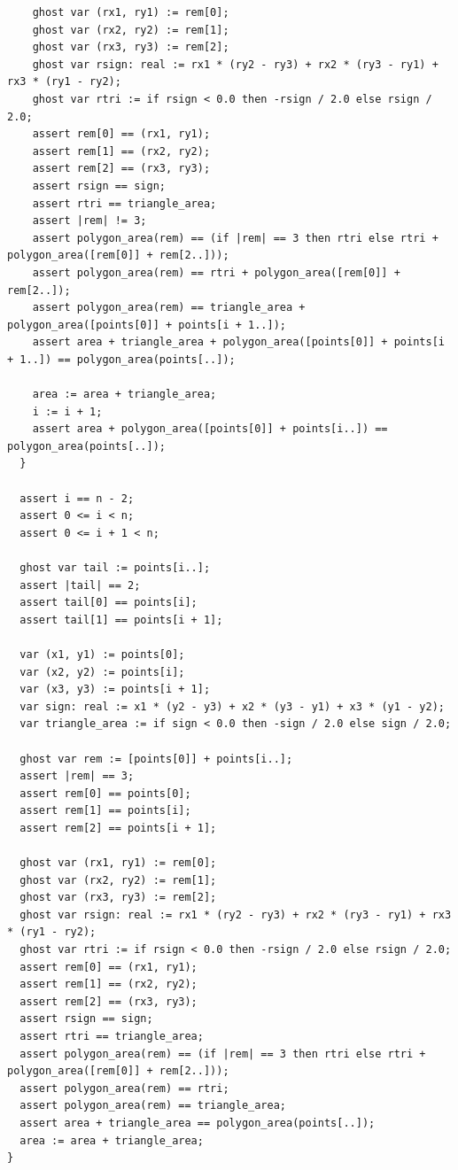 \documentclass{article}
\begin{document}
\begin{lstlisting}
    ghost var (rx1, ry1) := rem[0];
    ghost var (rx2, ry2) := rem[1];
    ghost var (rx3, ry3) := rem[2];
    ghost var rsign: real := rx1 * (ry2 - ry3) + rx2 * (ry3 - ry1) + rx3 * (ry1 - ry2);
    ghost var rtri := if rsign < 0.0 then -rsign / 2.0 else rsign / 2.0;
    assert rem[0] == (rx1, ry1);
    assert rem[1] == (rx2, ry2);
    assert rem[2] == (rx3, ry3);
    assert rsign == sign;
    assert rtri == triangle_area;
    assert |rem| != 3;
    assert polygon_area(rem) == (if |rem| == 3 then rtri else rtri + polygon_area([rem[0]] + rem[2..]));
    assert polygon_area(rem) == rtri + polygon_area([rem[0]] + rem[2..]);
    assert polygon_area(rem) == triangle_area + polygon_area([points[0]] + points[i + 1..]);
    assert area + triangle_area + polygon_area([points[0]] + points[i + 1..]) == polygon_area(points[..]);

    area := area + triangle_area;
    i := i + 1;
    assert area + polygon_area([points[0]] + points[i..]) == polygon_area(points[..]);
  }

  assert i == n - 2;
  assert 0 <= i < n;
  assert 0 <= i + 1 < n;

  ghost var tail := points[i..];
  assert |tail| == 2;
  assert tail[0] == points[i];
  assert tail[1] == points[i + 1];

  var (x1, y1) := points[0];
  var (x2, y2) := points[i];
  var (x3, y3) := points[i + 1];
  var sign: real := x1 * (y2 - y3) + x2 * (y3 - y1) + x3 * (y1 - y2);
  var triangle_area := if sign < 0.0 then -sign / 2.0 else sign / 2.0;

  ghost var rem := [points[0]] + points[i..];
  assert |rem| == 3;
  assert rem[0] == points[0];
  assert rem[1] == points[i];
  assert rem[2] == points[i + 1];

  ghost var (rx1, ry1) := rem[0];
  ghost var (rx2, ry2) := rem[1];
  ghost var (rx3, ry3) := rem[2];
  ghost var rsign: real := rx1 * (ry2 - ry3) + rx2 * (ry3 - ry1) + rx3 * (ry1 - ry2);
  ghost var rtri := if rsign < 0.0 then -rsign / 2.0 else rsign / 2.0;
  assert rem[0] == (rx1, ry1);
  assert rem[1] == (rx2, ry2);
  assert rem[2] == (rx3, ry3);
  assert rsign == sign;
  assert rtri == triangle_area;
  assert polygon_area(rem) == (if |rem| == 3 then rtri else rtri + polygon_area([rem[0]] + rem[2..]));
  assert polygon_area(rem) == rtri;
  assert polygon_area(rem) == triangle_area;
  assert area + triangle_area == polygon_area(points[..]);
  area := area + triangle_area;
}
\end{lstlisting}
\end{document}
